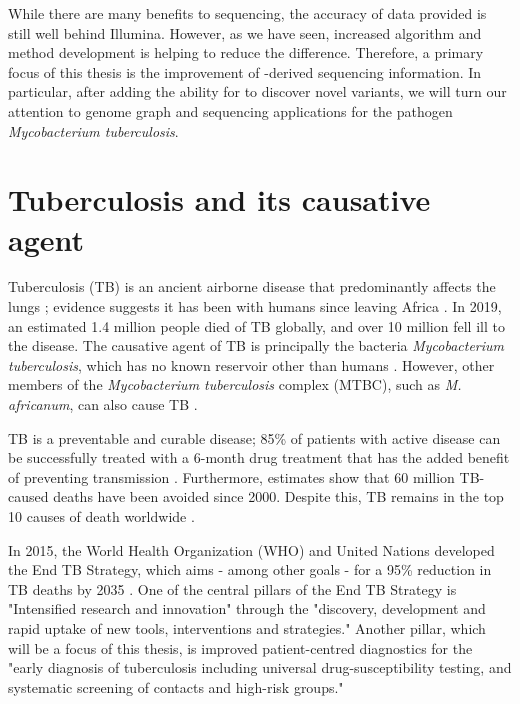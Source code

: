 \hspace{0.75cm}

\noindent
While there are many benefits to \ont{} sequencing, the accuracy of data provided is still well behind Illumina. However, as we have seen, increased algorithm and method development is helping to reduce the difference. Therefore, a primary focus of this thesis is the improvement of \ont{}-derived sequencing information. In particular, after adding the ability for \pandora{} to discover novel variants, we will turn our attention to genome graph and \ont{} sequencing applications for the pathogen \textit{Mycobacterium tuberculosis}.

\section{Tuberculosis and its causative agent}
\label{sec:tb}

Tuberculosis (TB) is an ancient airborne disease that predominantly affects the lungs \cite{Pai2016}; evidence suggests it has been with humans since leaving Africa \cite{Wirth2008,Comas2013}. In 2019, an estimated 1.4 million people died of TB globally, and over 10 million fell ill to the disease\cite{who2020}. The causative agent of TB is principally the bacteria \textit{Mycobacterium tuberculosis}, which has no known reservoir other than humans \cite{Comas2013}. However, other members of the \textit{Mycobacterium tuberculosis} complex (MTBC), such as \textit{M. africanum}, can also cause TB \cite{Pai2016}. 

TB is a preventable and curable disease; 85\% of patients with active disease can be successfully treated with a 6-month drug treatment that has the added benefit of preventing transmission \cite{who2020}. Furthermore, estimates show that 60 million TB-caused deaths have been avoided since 2000. Despite this, TB remains in the top 10 causes of death worldwide \cite{who2020}. 

In 2015, the World Health Organization (WHO) and United Nations developed the End TB Strategy, which aims - among other goals - for a 95\% reduction in TB deaths by 2035 \cite{endtb2020}. One of the central pillars of the End TB Strategy is "Intensified research and innovation" through the "discovery, development and rapid uptake of new tools, interventions and strategies." Another pillar, which will be a focus of this thesis, is improved patient-centred diagnostics for the "early diagnosis of tuberculosis including universal drug-susceptibility testing, and systematic screening of contacts and high-risk groups."

